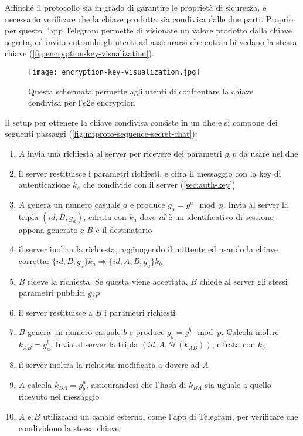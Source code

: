Affinché il protocollo sia in grado di garantire le proprietà di sicurezza, è necessario verificare che la chiave prodotta sia condivisa dalle due parti.
Proprio per questo l'app Telegram permette di visionare un valore prodotto dalla chiave segreta, ed invita entrambi gli utenti ad assicurarsi che entrambi vedano la stessa chiave  (\autoref{fig:encryption-key-visualization}).

\begin{figure}[h]
    \centering
    \texttt{[image: encryption-key-visualization.jpg]}
    \caption{Questa schermata permette agli utenti di confrontare la chiave condivisa per l'\gls{e2e} encryption \cite{que:secret-chat}} \label{fig:encryption-key-visualization}
\end{figure}

Il setup per ottenere la chiave condivisa consiste in un \gls{dhe} e si compone dei seguenti passaggi (\autoref{fig:mtproto-sequence-secret-chat}):

\begin{enumerate}
    \item $A$ invia una richiesta al server per ricevere dei parametri $g, p$ da usare nel \gls{dhe}
    \item il server restituisce i parametri richiesti, e cifra il messaggio con la key di autenticazione $k_a$ che condivide con il server (\autoref{sec:auth-key})
    \item $A$ genera un numero casuale $a$ e produce $g_a = g^a \mod p$. Invia al server la tripla $(id, B, g_a)$, cifrata con $k_a$ dove $id$ è un identificativo di sessione
          appena generato e $B$ è il destinatario
    \item il server inoltra la richiesta, aggiungendo il mittente ed usando la chiave corretta: $\{id, B, g_a\}k_a \Rightarrow \{id, A, B, g_a\}k_b$
    \item $B$ riceve la richiesta. Se questa viene accettata, $B$ chiede al server gli stessi parametri pubblici $g, p$
    \item il server restituisce a $B$ i parametri richiesti
    \item $B$ genera un numero casuale $b$ e produce $g_b = g^b \mod p$. Calcola inoltre $k_{AB} = g_a^b$. Invia al server la tripla $(id, A, \mathcal{H}(k_{AB}))$, cifrata con $k_b$
    \item il server inoltra la richiesta modificata a dovere ad $A$
    \item $A$ calcola $k_{BA} = g_b^a$, assicurandosi che l'hash di $k_{BA}$ sia uguale a quello ricevuto nel messaggio
    \item $A$ e $B$ utilizzano un canale esterno, come l'app di Telegram, per verificare che condividono la stessa chiave
\end{enumerate}

